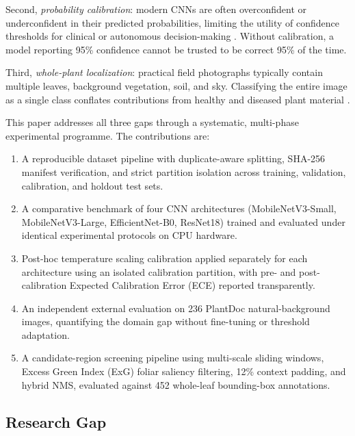 \documentclass[pdflatex,sn-mathphys-num]{sn-jnl}
\begin{document}
Second, \textit{probability calibration}: modern CNNs are often overconfident or
underconfident in their predicted probabilities, limiting the utility of confidence
thresholds for clinical or autonomous decision-making \citep{guo2017calibration,minderer2021calibration}.
Without calibration, a model reporting 95\% confidence cannot be trusted to be correct
95\% of the time.

Third, \textit{whole-plant localization}: practical field photographs typically contain
multiple leaves, background vegetation, soil, and sky. Classifying the entire image as a
single class conflates contributions from healthy and diseased plant material
\citep{barbedo2019factors,ren2015fasterrcnn}.

This paper addresses all three gaps through a systematic, multi-phase experimental
programme. The contributions are:

\begin{enumerate}
  \item A reproducible dataset pipeline with duplicate-aware splitting, SHA-256 manifest
        verification, and strict partition isolation across training, validation,
        calibration, and holdout test sets.
  \item A comparative benchmark of four CNN architectures (MobileNetV3-Small,
        MobileNetV3-Large, EfficientNet-B0, ResNet18) trained and evaluated under
        identical experimental protocols on CPU hardware.
  \item Post-hoc temperature scaling calibration applied separately for each architecture
        using an isolated calibration partition, with pre- and post-calibration Expected
        Calibration Error (ECE) reported transparently.
  \item An independent external evaluation on 236 PlantDoc natural-background images,
        quantifying the domain gap without fine-tuning or threshold adaptation.
  \item A candidate-region screening pipeline using multi-scale sliding windows, Excess
        Green Index (ExG) foliar saliency filtering, 12\% context padding, and hybrid
        NMS, evaluated against 452 whole-leaf bounding-box annotations.
\end{enumerate}

\subsection{Research Gap}
\label{sec:research_gap}
\end{document}
